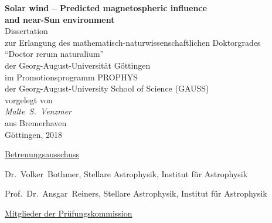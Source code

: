 
\begin{titlepage}
	\begin{center}
		\vspace*{\fill}
		\renewcommand{\baselinestretch}{1.5}
		{\LARGE\sffamily
			\textbf{Solar wind -- Predicted magnetospheric influence\\and near-Sun environment}\\
		}
		\Large\rmfamily
		\vspace{3\baselineskip}
		Dissertation\\
		zur Erlangung des mathematisch-naturwissenschaftlichen Doktorgrades\\
		``Doctor rerum naturalium''\\
		der Georg-August-Universität Göttingen\\
		\vspace{\baselineskip}
		im Promotionsprogramm PROPHYS\\
		der Georg-August-University School of Science (GAUSS)\\
		\vspace{4\baselineskip}
		vorgelegt von\\
		\textit{%
			Malte~S.~Venzmer\\
		}
		aus Bremerhaven\\
		\vspace{4\baselineskip}
		Göttingen, 2018
		\vspace{\baselineskip}
		\vspace{\fill}
	\end{center}
\end{titlepage}

\newpage


\vspace*{\fill}

\noindent \underline{Betreuungsausschuss}
\vspace{\baselineskip}

Dr.~Volker~Bothmer, Stellare Astrophysik, Institut für Astrophysik
\vspace{\baselineskip}

Prof.~Dr.~Ansgar~Reiners, Stellare Astrophysik, Institut für Astrophysik
% 
\vspace{3\baselineskip}

\noindent \underline{Mitglieder der Prüfungskommission}
\vspace{\baselineskip}

